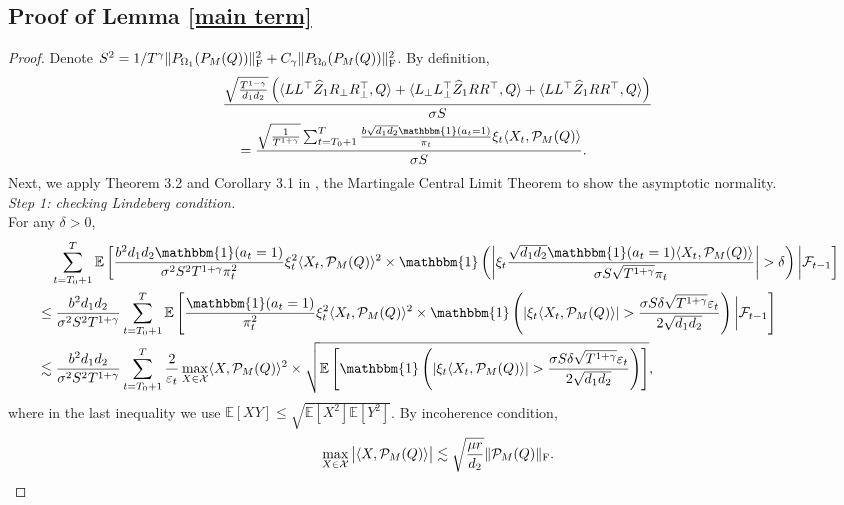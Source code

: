 \documentclass[12pt]{article}
\newcommand\fro[1]{\| #1 \|_{\rm{F}}}
\newcommand{\inp}[2]{\langle #1,#2\rangle}
\def\EE{{\mathbb E}}
\theoremstyle{plain}
\begin{document}
\subsection{Proof of Lemma \ref{main term}}
\begin{proof}
    Denote $S^2=1/T^{\gamma}\fro{P_{\Omega_1}(P_M(Q))}^2+C_{\gamma}\fro{P_{\Omega_0}(P_M(Q))}^2$. By definition, 
    \begin{align*}
        &\frac{\sqrt{\frac{T^{1-\gamma}}{d_1d_2}}\left(\inp{LL^{\top}\widehat{Z}_1R_{\perp}R_{\perp}^{\top}}{Q} + \inp{L_{\perp}L_{\perp}^{\top}\widehat{Z}_1RR^{\top}}{Q} + \inp{LL^{\top}\widehat{Z}_1RR^{\top}}{Q} \right)}{\sigma S} \\ &\quad = \frac{\sqrt{\frac{1}{T^{1+\gamma}}} \sum_{t=T_0+1}^T \frac{b\sqrt{d_1d_2}\mathbbm{1}(a_t=1)}{\pi_t}\xi_t\inp{X_t}{\mathcal{P}_M(Q)}}{\sigma S}.
    \end{align*}
    Next, we apply Theorem 3.2 and Corollary 3.1 in \cite{hall2014martingale}, the Martingale Central Limit Theorem to show the asymptotic normality. \\
    \emph{Step 1: checking Lindeberg condition.} \\
    For any $\delta>0$,
    \begin{align*}
        &\quad \sum_{t=T_0+1}^T \EE\left[\frac{b^2d_1d_2\mathbbm{1}(a_t=1)}{\sigma^2S^2T^{1+\gamma}\pi_t^2}\xi_t^2\inp{X_t}{\mathcal{P}_M(Q)}^2 \times  \mathbbm{1}\left(\left|\xi_t\frac{\sqrt{d_1d_2}\mathbbm{1}(a_t=1)\inp{X_t}{\mathcal{P}_M(Q)}}{\sigma S\sqrt{T^{1+\gamma}}\pi_t}\right|>\delta \right)\bigg|\mathcal{F}_{t-1}\right] \\
        &\leq \frac{b^2d_1d_2}{\sigma^2S^2T^{1+\gamma}}\sum_{t=T_0+1}^T \EE\left[\frac{\mathbbm{1}(a_t=1)}{\pi_t^2}\xi_t^2\inp{X_t}{\mathcal{P}_M(Q)}^2 \times  \mathbbm{1}\left(\left|\xi_t\inp{X_t}{\mathcal{P}_M(Q)}\right|>\frac{\sigma S\delta\sqrt{T^{1+\gamma}}\varepsilon_t}{2\sqrt{d_1d_2}} \right)\bigg|\mathcal{F}_{t-1}\right] \\
        &\lesssim \frac{b^2d_1d_2}{\sigma^2S^2T^{1+\gamma}}  \sum_{t=T_0+1}^T \frac{2}{\varepsilon_t}\max_{X\in \mathcal{X}} \inp{X}{\mathcal{P}_M(Q)}^2 \times \sqrt{\EE\left[\mathbbm{1}\left(\left|\xi_t\inp{X_t}{\mathcal{P}_M(Q)}\right|>\frac{\sigma S\delta\sqrt{T^{1+\gamma}}\varepsilon_t}{2\sqrt{d_1d_2}} \right)\right]},
    \end{align*}
    where in the last inequality we use $\EE[XY]\leq \sqrt{\EE[X^2]\EE[Y^2]}$.
    By incoherence condition, 
    \begin{align*}       
    \max_{X\in \mathcal{X}} \big|\inp{X}{\mathcal{P}_M(Q)}\big|\lesssim \sqrt{\frac{\mu r}{d_2}}\fro{\mathcal{P}_M(Q)}.

\end{align*}
\end{proof}
\end{document}
